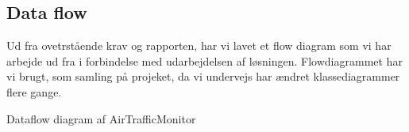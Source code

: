 
\subsection{Data flow}
Ud fra ovetrstående krav og rapporten, har vi lavet et flow diagram som vi har arbejde ud fra i forbindelse med udarbejdelsen af løsningen. 
Flowdiagrammet har vi brugt, som samling på projeket, da vi undervejs har ændret klassediagrammer flere gange. 


 {Dataflow diagram af AirTrafficMonitor}